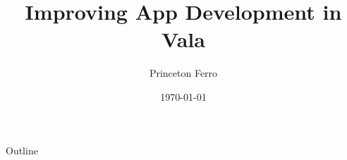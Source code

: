 \documentclass[t]{beamer}
\title{Improving App Development in Vala}
\author{Princeton Ferro}
\date{\today}
\begin{document}
\begin{frame}
    \titlepage
\end{frame}

\begin{frame}[c]{Outline}
    \tableofcontents
\end{frame}


%    
\end{document}
